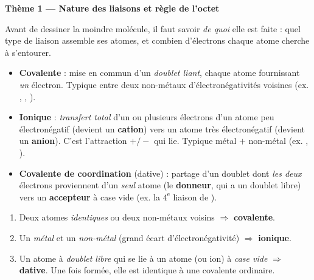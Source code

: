 \documentclass[11pt,a4paper]{article}
\begin{document}
\begin{center}
{\Large\bfseries\color{primarydark} Thème 1 — Nature des liaisons et règle de l'octet}
\end{center}

\smallskip
Avant de dessiner la moindre molécule, il faut savoir \emph{de quoi} elle est faite : quel type
de liaison assemble ses atomes, et combien d'électrons chaque atome cherche à s'entourer.

\begin{cle}
\begin{itemize}[leftmargin=1.5em,topsep=2pt,itemsep=2pt]
  \item \textbf{Covalente} : mise en commun d'un \emph{doublet liant}, chaque atome fournissant
        \emph{un} électron. Typique entre deux non-métaux d'électronégativités voisines
        (ex. , , ).
  \item \textbf{Ionique} : \emph{transfert total} d'un ou plusieurs électrons d'un atome peu
        électronégatif (devient un \textbf{cation}) vers un atome très électronégatif (devient un
        \textbf{anion}). C'est l'attraction $+/-$ qui lie. Typique métal $+$ non-métal
        (ex. , ).
  \item \textbf{Covalente de coordination} (dative) : partage d'un doublet dont \emph{les deux}
        électrons proviennent d'un \emph{seul} atome (le \textbf{donneur}, qui a un doublet libre)
        vers un \textbf{accepteur} à case vide (ex. la $4^{\text{e}}$ liaison de ).
\end{itemize}
\end{cle}

\begin{methode}
\begin{enumerate}[leftmargin=1.9em,topsep=2pt,itemsep=1.5pt]
  \item Deux atomes \emph{identiques} ou deux non-métaux voisins $\Rightarrow$ \textbf{covalente}.
  \item Un \emph{métal} et un \emph{non-métal} (grand écart d'électronégativité) $\Rightarrow$
        \textbf{ionique}.
  \item Un atome à \emph{doublet libre} qui se lie à un atome (ou ion) à \emph{case vide}
        $\Rightarrow$ \textbf{dative}. Une fois formée, elle est identique à une covalente ordinaire.
\end{enumerate}
\end{methode}
\end{document}
